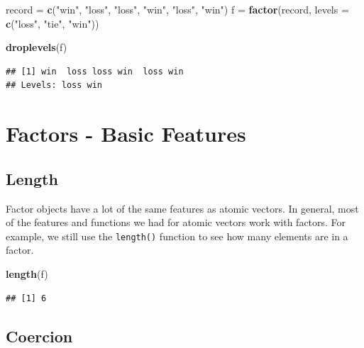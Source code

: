 \documentclass[
]{book}
\newenvironment{Shaded}{\begin{snugshade}}{\end{snugshade}}
\newcommand{\DataTypeTok}[1]{\textcolor[rgb]{0.13,0.29,0.53}{#1}}
\newcommand{\KeywordTok}[1]{\textcolor[rgb]{0.13,0.29,0.53}{\textbf{#1}}}
\newcommand{\NormalTok}[1]{#1}
\newcommand{\StringTok}[1]{\textcolor[rgb]{0.31,0.60,0.02}{#1}}
\begin{document}
\begin{Shaded}
\begin{Highlighting}[]
\NormalTok{record =}\StringTok{ }\KeywordTok{c}\NormalTok{(}\StringTok{"win"}\NormalTok{, }\StringTok{"loss"}\NormalTok{, }\StringTok{"loss"}\NormalTok{, }\StringTok{"win"}\NormalTok{, }\StringTok{"loss"}\NormalTok{, }\StringTok{"win"}\NormalTok{)}
\NormalTok{f =}\StringTok{ }\KeywordTok{factor}\NormalTok{(record, }\DataTypeTok{levels =} \KeywordTok{c}\NormalTok{(}\StringTok{"loss"}\NormalTok{, }\StringTok{"tie"}\NormalTok{, }\StringTok{"win"}\NormalTok{))}

\KeywordTok{droplevels}\NormalTok{(f)}
\end{Highlighting}
\end{Shaded}

\begin{verbatim}
## [1] win  loss loss win  loss win 
## Levels: loss win
\end{verbatim}

\hypertarget{factors---basic-features}{%
\section{Factors - Basic Features}\label{factors---basic-features}}

\hypertarget{length-1}{%
\subsection{Length}\label{length-1}}

Factor objects have a lot of the same features as atomic vectors. In general, most of the features and functions we had for atomic vectors work with factors. For example, we still use the \texttt{length()} function to see how many elements are in a factor.

\begin{Shaded}
\begin{Highlighting}[]
\KeywordTok{length}\NormalTok{(f)}
\end{Highlighting}
\end{Shaded}

\begin{verbatim}
## [1] 6
\end{verbatim}

\hypertarget{coercion-1}{%
\subsection{Coercion}\label{coercion-1}}
\end{document}

